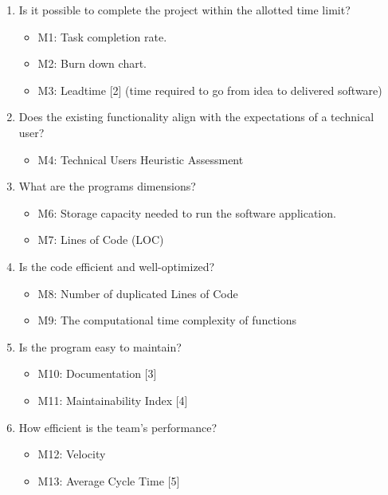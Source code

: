     \begin{enumerate}
        \item Is it possible to complete the project within the allotted time limit?
        \begin{itemize}
            \item M1: Task completion rate.
            \item M2: Burn down chart.
            \item M3: Leadtime {[}2{]} (time required to go from idea to delivered software)
        \end{itemize}

        \item Does the existing functionality align with the expectations of a technical user?
        \begin{itemize}
            \item M4: Technical User\textquotesingle s Heuristic Assessment
        \end{itemize}

        \item What are the program\textquotesingle s dimensions?
        \begin{itemize}
            \item M6: Storage capacity needed to run the software application.
            \item M7: Lines of Code (LOC)
        \end{itemize}

        \item Is the code efficient and well-optimized?
        \begin{itemize}
            \item M8: Number of duplicated Lines of Code
            \item M9: The computational time complexity of functions
        \end{itemize}

        \item Is the program easy to maintain?
        \begin{itemize}
            \item M10: Documentation {[}3{]}
            \item M11: Maintainability Index {[}4{]}
        \end{itemize}

        \item How efficient is the team's performance?
        \begin{itemize}
            \item M12: Velocity
            \item M13: Average Cycle Time {[}5{]}
        \end{itemize}


\end{enumerate}

